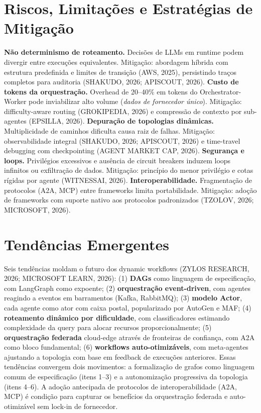 \documentclass[12pt,a4paper]{article}
\begin{document}
\section{Riscos, Limitações e Estratégias de Mitigação}

\textbf{Não determinismo de roteamento.} Decisões de LLMs em runtime podem divergir entre execuções equivalentes. Mitigação: abordagem híbrida com estrutura predefinida e limites de transição (AWS, 2025), persistindo traços completos para auditoria (SHAKUDO, 2026; APISCOUT, 2026). \textbf{Custo de tokens da orquestração.} Overhead de 20–40\% em tokens do Orchestrator-Worker pode inviabilizar alto volume (\textit{dados de fornecedor único}). Mitigação: difficulty-aware routing (GROKIPEDIA, 2026) e compressão de contexto por sub-agentes (EPSILLA, 2026). \textbf{Depuração de topologias dinâmicas.} Multiplicidade de caminhos dificulta causa raiz de falhas. Mitigação: observabilidade integral (SHAKUDO, 2026; APISCOUT, 2026) e time-travel debugging com checkpointing (AGENT MARKET CAP, 2026). \textbf{Segurança e loops.} Privilégios excessivos e ausência de circuit breakers induzem loops infinitos ou exfiltração de dados. Mitigação: princípio do menor privilégio e cotas rígidas por agente (WITNESSAI, 2026). \textbf{Interoperabilidade.} Fragmentação de protocolos (A2A, MCP) entre frameworks limita portabilidade. Mitigação: adoção de frameworks com suporte nativo aos protocolos padronizados (TZOLOV, 2026; MICROSOFT, 2026).


\section{Tendências Emergentes}

Seis tendências moldam o futuro dos dynamic workflows (ZYLOS RESEARCH, 2026; MICROSOFT LEARN, 2026): (1) \textbf{DAGs} como linguagem de especificação, com LangGraph como expoente; (2) \textbf{orquestração event-driven}, com agentes reagindo a eventos em barramentos (Kafka, RabbitMQ); (3) \textbf{modelo Actor}, cada agente como ator com caixa postal, popularizado por AutoGen e MAF; (4) \textbf{roteamento dinâmico por dificuldade}, com classificadores estimando complexidade da query para alocar recursos proporcionalmente; (5) \textbf{orquestração federada} cloud-edge através de fronteiras de confiança, com A2A como bloco fundamental; (6) \textbf{workflows auto-otimizáveis}, com meta-agentes ajustando a topologia com base em feedback de execuções anteriores. Essas tendências convergem dois movimentos: a formalização de grafos como linguagem comum de especificação (itens 1–3) e a autonomização progressiva da topologia (itens 4–6). A adoção antecipada de protocolos de interoperabilidade (A2A, MCP) é condição para capturar os benefícios da orquestração federada e auto-otimizável sem lock-in de fornecedor.
\end{document}
